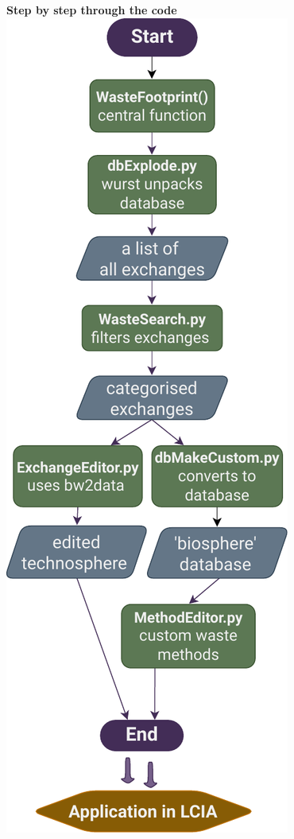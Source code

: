 \documentclass[a0paper,fleqn]{betterposter}
\begin{document}
{}{
{\selectfont\textbf{Step by step through the code}}\\

\includegraphics[width=\textwidth]{img/Flowchart_WasteFootprint}
}
\end{document}
